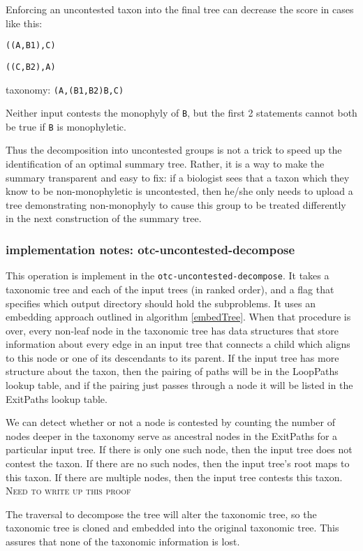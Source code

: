 \documentclass[11pt]{article}
\newcommand{\newick}[1]{\texttt{#1}\xspace}
\newcommand{\comment}[1]{{\color{red} \textsc{#1}}\xspace}
\newcommand{\ProofWriteupNeeded}{{\comment{Need to write up this proof}}}
\begin{document}
Enforcing an uncontested taxon into the final tree can decrease the score in cases like this:
\begin{compactenum}
\item \newick{((A,B1),C)}
\item \newick{((C,B2),A)}
\item taxonomy: \newick{(A,(B1,B2)B,C)}
\end{compactenum}
Neither input contests the monophyly of \texttt{B}, but the first 2 statements cannot 
    both be true if \texttt{B} is monophyletic.

Thus the decomposition into uncontested groups is not a trick to speed up
    the identification of an optimal summary tree.
Rather, it is a way to make the summary transparent and easy to fix:
    if a biologist sees that a taxon which they know to be non-monophyletic
    is uncontested, then he/she only needs to upload a tree demonstrating
    non-monophyly to cause this group to be treated differently in the next 
    construction of the summary tree.

\subsubsection{implementation notes: otc-uncontested-decompose}
This operation is implement in the {\tt otc-uncontested-decompose}.
It takes a taxonomic tree and each of the input trees (in ranked order), and a flag
    that specifies which output directory should hold the subproblems.
It uses an embedding approach outlined in algorithm \ref{embedTree}.
When that procedure is over, every non-leaf node in the taxonomic tree
    has data structures that store information about every edge in 
    an input tree that connects a child which aligns to this node or one of its descendants
    to its parent.
If the input tree has more structure about the taxon, then the pairing of paths will be in the 
    LoopPaths lookup table, and if the pairing just passes through a node it will be listed in
    the ExitPaths lookup table.

We can detect whether or not a node is contested by counting the number of nodes deeper in the 
    taxonomy serve as ancestral nodes in the ExitPaths for a particular input tree.
If there is only one such node, then the input tree does not contest the taxon.
If there are no such nodes, then the input tree's root maps to this taxon.
If there are multiple nodes, then the input tree contests this taxon.
\ProofWriteupNeeded

The traversal to decompose the tree will alter the taxonomic tree, so the taxonomic tree 
     is cloned and embedded into the original taxonomic tree.
This assures that none of the taxonomic information is lost.
\end{document}
